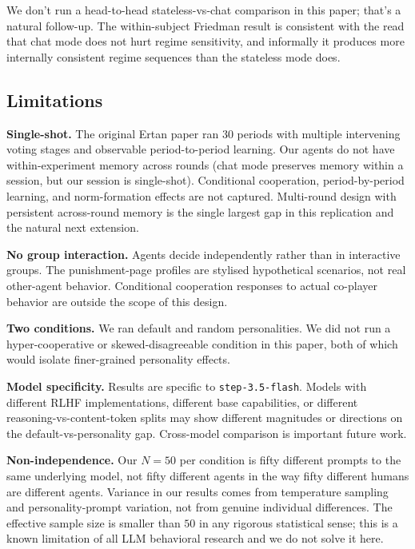 \documentclass[12pt, a4paper]{article}
\begin{document}
We don't run a head-to-head stateless-vs-chat comparison in this paper; that's a natural follow-up. The within-subject Friedman result is consistent with the read that chat mode does not hurt regime sensitivity, and informally it produces more internally consistent regime sequences than the stateless mode does.

\subsection{Limitations}

\textbf{Single-shot.} The original Ertan paper ran $30$ periods with multiple intervening voting stages and observable period-to-period learning. Our agents do not have within-experiment memory across rounds (chat mode preserves memory within a session, but our session is single-shot). Conditional cooperation, period-by-period learning, and norm-formation effects are not captured. Multi-round design with persistent across-round memory is the single largest gap in this replication and the natural next extension.

\textbf{No group interaction.} Agents decide independently rather than in interactive groups. The punishment-page profiles are stylised hypothetical scenarios, not real other-agent behavior. Conditional cooperation responses to actual co-player behavior are outside the scope of this design.

\textbf{Two conditions.} We ran default and random personalities. We did not run a hyper-cooperative or skewed-disagreeable condition in this paper, both of which would isolate finer-grained personality effects.

\textbf{Model specificity.} Results are specific to \texttt{step-3.5-flash}. Models with different RLHF implementations, different base capabilities, or different reasoning-vs-content-token splits may show different magnitudes or directions on the default-vs-personality gap. Cross-model comparison is important future work.

\textbf{Non-independence.} Our $N=50$ per condition is fifty different prompts to the same underlying model, not fifty different agents in the way fifty different humans are different agents. Variance in our results comes from temperature sampling and personality-prompt variation, not from genuine individual differences. The effective sample size is smaller than $50$ in any rigorous statistical sense; this is a known limitation of all LLM behavioral research \citep{horton2023homo} and we do not solve it here.
\end{document}
